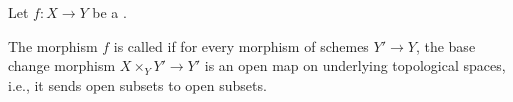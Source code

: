 \begin{definition} \label{definition:universally_open_morphism_of_schemes}
    Let $f: X \to Y$ be a .

    The morphism $f$ is called  if for every morphism of schemes $Y' \to Y$, the base change morphism $X \times_Y Y' \to Y'$ is an open map on underlying topological spaces, i.e., it sends open subsets to open subsets.
\end{definition}
